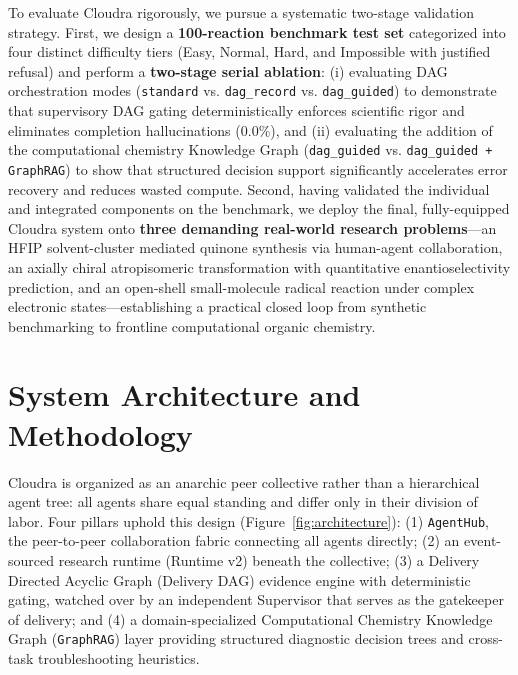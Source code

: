 \documentclass[10pt,twocolumn,letterpaper]{article}
\begin{document}
To evaluate Cloudra rigorously, we pursue a systematic two-stage validation strategy. First, we design a \textbf{100-reaction benchmark test set} categorized into four distinct difficulty tiers (Easy, Normal, Hard, and Impossible with justified refusal) and perform a \textbf{two-stage serial ablation}: (i) evaluating DAG orchestration modes (\texttt{standard} vs. \texttt{dag\_record} vs. \texttt{dag\_guided}) to demonstrate that supervisory DAG gating deterministically enforces scientific rigor and eliminates completion hallucinations ($0.0\%$), and (ii) evaluating the addition of the computational chemistry Knowledge Graph (\texttt{dag\_guided} vs. \texttt{dag\_guided + GraphRAG}) to show that structured decision support significantly accelerates error recovery and reduces wasted compute. Second, having validated the individual and integrated components on the benchmark, we deploy the final, fully-equipped Cloudra system onto \textbf{three demanding real-world research problems}---an HFIP solvent-cluster mediated quinone synthesis via human-agent collaboration, an axially chiral atropisomeric transformation with quantitative enantioselectivity prediction, and an open-shell small-molecule radical reaction under complex electronic states---establishing a practical closed loop from synthetic benchmarking to frontline computational organic chemistry.

\section{System Architecture and Methodology}

Cloudra is organized as an anarchic peer collective rather than a hierarchical agent tree: all agents share equal standing and differ only in their division of labor. Four pillars uphold this design (Figure~\ref{fig:architecture}): (1) \texttt{AgentHub}, the peer-to-peer collaboration fabric connecting all agents directly; (2) an event-sourced research runtime (Runtime v2) beneath the collective; (3) a Delivery Directed Acyclic Graph (Delivery DAG) evidence engine with deterministic gating, watched over by an independent Supervisor that serves as the gatekeeper of delivery; and (4) a domain-specialized Computational Chemistry Knowledge Graph (\texttt{GraphRAG}) layer providing structured diagnostic decision trees and cross-task troubleshooting heuristics.
\end{document}
